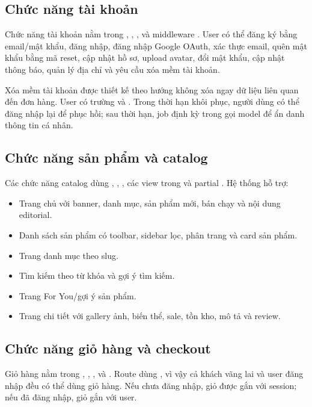 \documentclass[12pt,a4paper]{report}
\begin{document}
\subsection{Chức năng tài khoản}

Chức năng tài khoản nằm trong , , ,  và middleware . User có thể đăng ký bằng email/mật khẩu, đăng nhập, đăng nhập Google OAuth, xác thực email, quên mật khẩu bằng mã reset, cập nhật hồ sơ, upload avatar, đổi mật khẩu, cập nhật thông báo, quản lý địa chỉ và yêu cầu xóa mềm tài khoản.

Xóa mềm tài khoản được thiết kế theo hướng không xóa ngay dữ liệu liên quan đến đơn hàng. User có trường  và . Trong thời hạn khôi phục, người dùng có thể đăng nhập lại để phục hồi; sau thời hạn, job định kỳ trong  gọi model để ẩn danh thông tin cá nhân.

\subsection{Chức năng sản phẩm và catalog}

Các chức năng catalog dùng , , , các view trong  và partial . Hệ thống hỗ trợ:

\begin{itemize}
    \item Trang chủ với banner, danh mục, sản phẩm mới, bán chạy và nội dung editorial.
    \item Danh sách sản phẩm có toolbar, sidebar lọc, phân trang và card sản phẩm.
    \item Trang danh mục theo slug.
    \item Tìm kiếm theo từ khóa và gợi ý tìm kiếm.
    \item Trang For You/gợi ý sản phẩm.
    \item Trang chi tiết với gallery ảnh, biến thể, sale, tồn kho, mô tả và review.
\end{itemize}

\subsection{Chức năng giỏ hàng và checkout}

Giỏ hàng nằm trong , , ,  và . Route dùng , vì vậy cả khách vãng lai và user đăng nhập đều có thể dùng giỏ hàng. Nếu chưa đăng nhập, giỏ được gắn với session; nếu đã đăng nhập, giỏ gắn với user.
\end{document}
